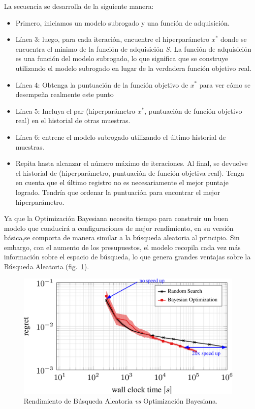 \documentclass[a4paper,12pt]{article}
\begin{document}
La secuencia se desarrolla de la siguiente manera:
\begin{itemize}
	\item Primero, iniciamos un modelo subrogado y una función de adquisición.
	\item Línea 3: luego, para cada iteración, encuentre el hiperparámetro $x^*$ donde se encuentra el mínimo de la función de adquisición $S$. La función de adquisición es una función del modelo subrogado, lo que significa que se construye utilizando el modelo subrogado en lugar de la verdadera función objetivo real.
	\item Línea 4: Obtenga la puntuación de la función objetivo de $x^*$ para ver cómo se desempeña realmente este punto
	\item Línea 5: Incluya el par (hiperparámetro $x^*$, puntuación de función objetivo real) en el historial de otras muestras.
	\item Línea 6: entrene el modelo subrogado utilizando el último historial de muestras.
	\item Repita hasta alcanzar el número máximo de iteraciones. Al final, se devuelve el historial de (hiperparámetro, puntuación de función objetiva real). Tenga en cuenta que el último registro no es necesariamente el mejor puntaje logrado. Tendría que ordenar la puntuación para encontrar el mejor hiperparámetro.
\end{itemize}

Ya que la Optimización Bayesiana necesita tiempo para construir un buen modelo que conducirá a configuraciones de mejor rendimiento, en su versión básica,se comporta de manera similar a la búsqueda aleatoria al principio. Sin embargo, con el aumento de los presupuestos, el modelo recopila cada vez más información sobre el espacio de búsqueda, lo que genera grandes ventajas sobre la Búsqueda Aleatoria (fig.~\ref{fig:rs_vs_bo}). \citep{automl-bohb}

\begin{figure}[H]
	\begin{center}
	\includegraphics[width=1\textwidth]{comparison_rs_bo.png}
  	\caption{Rendimiento de Búsqueda Aleatoria \textit{vs} Optimización Bayesiana.}
  	\label{fig:rs_vs_bo}
  	\end{center}
\end{figure}
\end{document}
